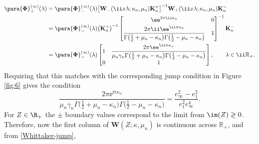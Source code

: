 \begin{align*}
 \para{\boldsymbol{\Phi}}_+^{(\infty)}(\lambda)&=\para{\boldsymbol{\Phi}}_-^{(\infty)}(\lambda)\big[\mathbf{W}_-(\ii x\lambda;\kappa_n,\mu_n)\mathbf{K}_n^{+}\big]^{-1}\mathbf{W}_+(\ii x\lambda;\kappa_n,\mu_n)\mathbf{K}_n^-\\
 &=\para{\boldsymbol{\Phi}}_-^{(\infty)}(\lambda)
 \big(\mathbf{K}^+_n\big)^{-1}
 \begin{bmatrix}
 \ee^{2\pi \ii\kappa_n} & 0\vspace{1mm}\\
 \displaystyle \frac{2\pi \ii\ee^{\ii\pi\kappa_n}}{\Gamma\big(\frac{1}{2}+\mu_n-\kappa_n\big)\Gamma\big(\frac{1}{2}-\mu_n-\kappa_n\big)} & 1
 \end{bmatrix}^{-1}
 \mathbf{K}^-_n\\
 &=\para{\boldsymbol{\Phi}}_-^{(\infty)}(\lambda)\begin{bmatrix}
 1 & \displaystyle\frac{2\pi \ee^{\ii\pi\kappa_n}}{\mu_n\gamma_n\Gamma\big(\frac{1}{2}+\mu_n-\kappa_n\big)\Gamma\big(\frac{1}{2}-\mu_n-\kappa_n\big)}\\
 0 & 1
 \end{bmatrix},\qquad \lambda\in \ii\mathbb{R}_+.
\end{align*}
Requiring that this matches with the corresponding jump condition in Figure \ref{fig:6} gives the condition
\begin{equation*}%
 \frac{2\pi \ee^{\ii\pi\kappa_n}}{\mu_n\gamma_n\Gamma\big(\frac{1}{2}+\mu_n-\kappa_n\big)\Gamma\big(\frac{1}{2}-\mu_n-\kappa_n\big)} = \frac{e_\infty^2-e_1^2}{e_1^2e_\infty^4}.
\end{equation*}
For $Z\in\R_+$ the $\pm$ boundary values correspond to the limit from $\im(Z)\gtrless 0$. Therefore, now the first column of $\mathbf{W}(Z;\kappa,\mu_n)$ is continuous across $\mathbb{R}_+$, and from \eqref{Whittaker-jump},
